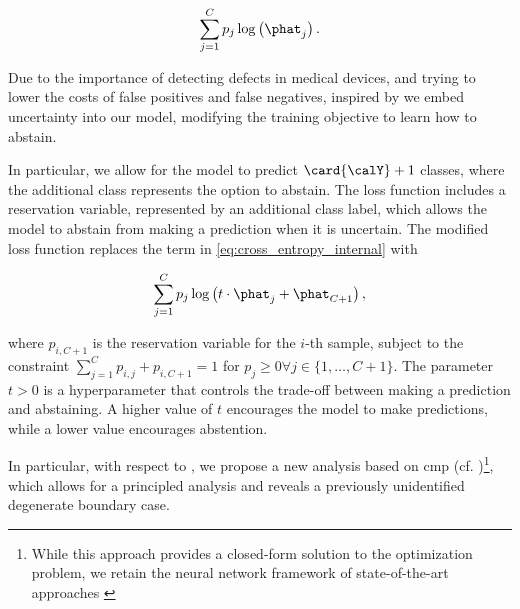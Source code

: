 \begin{align}
    \label{eq:cross_entropy_internal}
    \sum_{j=1}^{C} p_{j}\log\left(\phat_{j}\right).
\end{align}

Due to the importance of detecting defects in medical devices, and trying to lower the costs of false positives and false negatives, inspired by \cite{markowitz1952portfolio,liu2019deep} we embed uncertainty into our model, modifying the training objective to learn how to abstain.

In particular, we allow for the model to predict \(\card{\calY} + 1\) classes, where the additional class represents the option to abstain. The loss function includes a reservation variable, represented by an additional class label, which allows the model to abstain from making a prediction when it is uncertain. The modified loss function replaces the term in \cref{eq:cross_entropy_internal} with

\begin{align}
    \label{eq:reject_cross_entropy_internal}
    \sum_{j=1}^{C} p_{j}\log\left(t\cdot\phat_{j}+\phat_{C+1}\right),
\end{align}

where \(p_{i,C+1}\) is the reservation variable for the \(i\)-th sample, subject to the constraint \(\sum_{j=1}^{C} p_{i,j}+p_{i,C+1}=1\) for \(p_j\ge 0 \forall j\in\{1,\ldots,C+1\}\). The parameter \(t>0\) is a hyperparameter that controls the trade-off between making a prediction and abstaining. A higher value of \(t\) encourages the model to make predictions, while a lower value encourages abstention.

In particular, with respect to \cite{liu2019deep}, we propose a new analysis based on \gls*{cmp} (cf. \cite{boyd2004convex})\footnote{While this approach provides a closed-form solution to the optimization problem, we retain the neural network framework of state-of-the-art approaches \cite{shenoy2026uncertainty}}, which allows for a principled analysis and reveals a previously unidentified degenerate boundary case.

